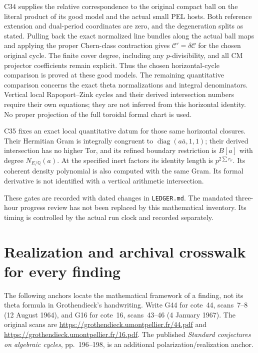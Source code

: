 \documentclass[11pt]{article}
\newcommand{\Q}{\mathbb Q}\newcommand{\C}{\mathbb C}\newcommand{\Z}{\mathbb Z}\newcommand{\R}{\mathbb R}\newcommand{\A}{\mathbb A}\newcommand{\OO}{\mathcal O}
\theoremstyle{definition}\newtheorem{definition}[theorem]{Definition}\newtheorem{remark}[theorem]{Remark}
\begin{document}
C34 supplies the relative correspondence to the original compact
ball on the literal product of its good model and the actual
small PEL hosts. Both reference extension and dual-period
coordinates are zero, and the degeneration splits as stated.
Pulling back the exact normalized line bundles along the actual
ball maps and applying the proper Chern-class contraction gives
$\mathcal C'=\delta\mathcal C$ for the chosen original cycle.
The finite cover degree, including any $p$-divisibility, and all
CM projector coefficients remain explicit. Thus the chosen
horizontal-cycle comparison is proved at these good models.
The remaining quantitative comparison concerns the exact theta
normalizations and integral denominators. Vertical local
Rapoport--Zink cycles and their derived intersection numbers
require their own equations; they are not inferred from this
horizontal identity. No proper projection of the full toroidal
formal chart is used.

C35 fixes an exact local quantitative datum for those same
horizontal closures. Their Hermitian Gram is integrally
congruent to $\operatorname{diag}(a\bar a,1,1)$; their derived
intersection has no higher Tor, and its refined boundary
restriction is $B[a]$ with degree $N_{E/\Q}(a)$.
At the specified inert factors its identity length is
$p^{2\sum r_\nu}$. Its coherent density polynomial is also
computed with the same Gram. Its formal derivative is not
identified with a vertical arithmetic intersection.

These gates are recorded with dated changes in \texttt{LEDGER.md}.
The mandated three-hour progress review has not been replaced by
this mathematical inventory. Its timing is controlled by the actual
run clock and recorded separately.


\appendix
\section{Realization and archival crosswalk for every finding}

The following anchors locate the mathematical framework of a
finding, not its theta formula in Grothendieck's handwriting.
Write G44 for cote~44, scans~7--8 (12 August 1964), and G16 for
cote~16, scans~43--46 (4 January 1967). The original scans are
\url{https://grothendieck.umontpellier.fr/44.pdf} and
\url{https://grothendieck.umontpellier.fr/16.pdf}.
The published \emph{Standard conjectures on algebraic cycles},
pp.~196--198, is an additional polarization/realization anchor.
\end{document}
